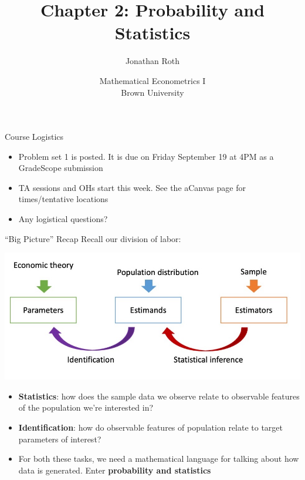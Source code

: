 \documentclass[11pt,english,handout]{beamer}
\begin{document}
\begin{frame}[noframenumbering]{}
\vspace{0.5cm}
\title[]{Chapter 2: Probability and Statistics}
\author{Jonathan Roth}
\date{Mathematical Econometrics I \\ Brown University \\ } 
\titlepage {\small{}\ }\thispagestyle{empty} \vspace{-30pt}

\end{frame}
 
\begin{frame}{Course Logistics}

\begin{itemize}
\item
Problem set 1 is posted. It is due on Friday September 19 at 4PM as a GradeScope submission
\bigskip

\item
TA sessions and OHs start this week. See the aCanvas page for times/tentative locations
\bigskip

\item
Any logistical questions?
\end{itemize}	
\end{frame}



\begin{frame}{``Big Picture'' Recap}
\vspace{0.1cm}
Recall our division of labor:
\begin{center}
\includegraphics[width=0.9\linewidth]{BigPicture.jpg}
\end{center}
\vspace{-0.2cm}

\begin{itemize}
\item
\textbf{Statistics}: how does the sample data we observe relate to observable features of the population we're interested in? 
\smallskip

\item
\textbf{Identification}: how do observable features of population relate to target parameters of interest? 
\smallskip
\pause{}

\item
For both these tasks, we need a mathematical language for talking about how data is generated. Enter \textbf{probability and statistics}


\end{itemize}

\end{frame}
\end{document}

